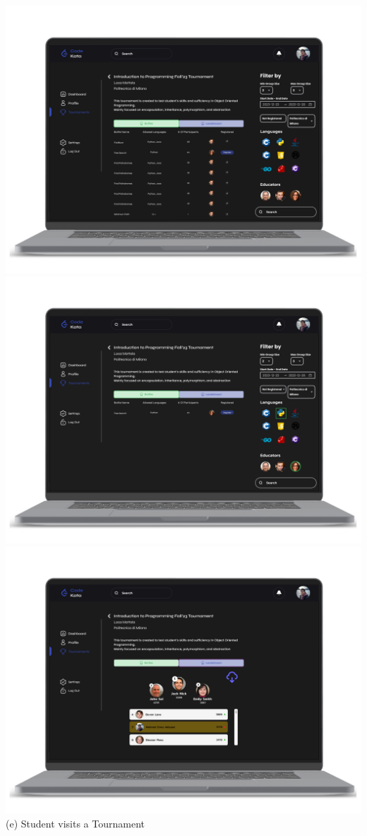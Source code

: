 \begin{center}
    \includegraphics[scale=0.13]{Images/ui-ux/student_tournament_1.png}
    \includegraphics[scale=0.13]{Images/ui-ux/student_tournament_2.png}    \includegraphics[scale=0.13]{Images/ui-ux/student_tournament_3.png} 
    \\ (e) Student visits a Tournament
\end{center}
